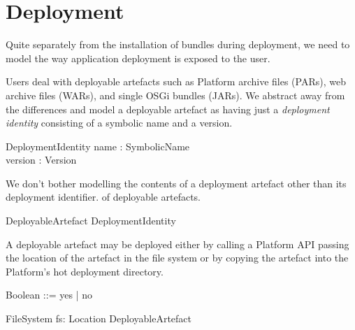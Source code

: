\documentclass[a4paper]{article}
\begin{document}
\clearpage
\section{Deployment}
\label{cha:deployment}

Quite separately from the installation of bundles during deployment, we need to model the way
application deployment is exposed to the user.

Users deal with deployable artefacts such as Platform archive files (PARs), web archive files (WARs), and single OSGi bundles (JARs). We abstract away from the differences and model a deployable
artefact as having just a \textit{deployment identity} consisting of a symbolic name and a version.
\begin{schema}{DeploymentIdentity}
 name : SymbolicName \\
 version : Version \\
\end{schema}

We don't bother modelling the contents of a deployment artefact other than its deployment identifier.
of deployable artefacts.
\begin{schema}{DeployableArtefact}
 DeploymentIdentity \\
\end{schema}

A deployable artefact may be deployed either by calling a Platform API passing the location of
the artefact in the file system or by copying the artefact into the Platform's hot deployment
directory.
\begin{zed}
  [Location]
\end{zed}

\begin{zed}
 Boolean ::= yes | no
\end{zed}

\begin{schema}{FileSystem}
 fs: Location \pfun DeployableArtefact \\
\end{schema}
\end{document}

